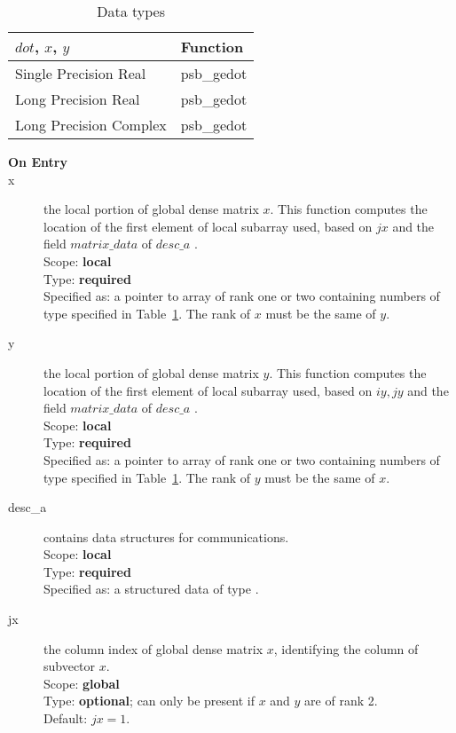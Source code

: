 \begin{table}[h]
\begin{center}
\begin{tabular}{ll}
\hline
$dot$, $x$, $y$ & {\bf Function}\\
\hline
Single Precision Real & psb\_gedot\\
Long Precision Real & psb\_gedot \\
Long Precision Complex & psb\_gedot \\	
\hline
\end{tabular}
\end{center}
\caption{Data types\label{tab:f90dot}}
\end{table}

\begin{description}
\item[\bf On Entry]
\item[x] the local portion of global dense matrix
$x$. This function computes the location of the first element of
local subarray used, based on $jx$ and the field $matrix\_data$ of $desc\_a$ . \\
Scope: {\bf local} \\
Type: {\bf required} \\
Specified as: a pointer to array of rank one or two
containing numbers of type specified in
Table~\ref{tab:f90dot}. The rank of $x$ must be the same of $y$. 
\item[y] the local portion of global dense matrix
$y$. This function computes the location of the first element of
local subarray used, based on $iy, jy$ and the field $matrix\_data$ of $desc\_a$ . \\
Scope: {\bf local} \\
Type: {\bf required} \\
Specified as: a pointer to array of rank one or two
containing numbers of type specified in
Table~\ref{tab:f90dot}. The rank of $y$ must be the same of $x$. 
\item[desc\_a] contains data structures for communications.\\
Scope: {\bf local} \\
Type: {\bf required}\\
Specified as: a structured data of type \descdata.
\item[jx]  the column index of global dense matrix $x$,
identifying the column of subvector $x$.\\
Scope: {\bf global} \\
Type: {\bf optional}; can only be present if $x$ and $y$ are of rank 2.\\
Default: $jx = 1$.\\


\end{description}

